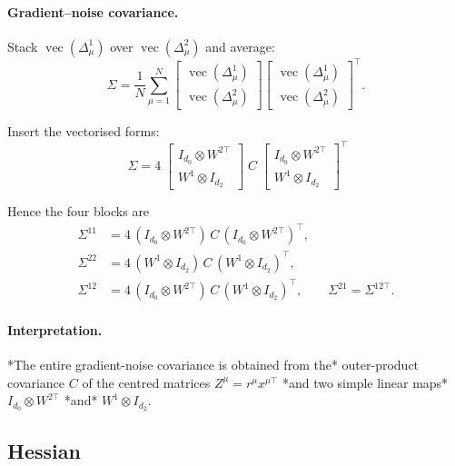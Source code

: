 \documentclass[11pt]{article}
\begin{document}
\paragraph{Gradient–noise covariance.}
Stack \(\operatorname{vec}(\Delta^{1}_{\mu})\) over \(\operatorname{vec}(\Delta^{2}_{\mu})\) and average:
\[
\Sigma
  =\frac1N\sum_{\mu=1}^{N}
  \begin{bmatrix}
      \operatorname{vec}(\Delta^{1}_{\mu})\\[2pt]
      \operatorname{vec}(\Delta^{2}_{\mu})
  \end{bmatrix}
  \begin{bmatrix}
      \operatorname{vec}(\Delta^{1}_{\mu})\\[2pt]
      \operatorname{vec}(\Delta^{2}_{\mu})
  \end{bmatrix}^{\!\top}.
\]

Insert the vectorised forms:
\[
\boxed{\;
\Sigma=
4\;
\begin{bmatrix}
I_{d_{0}}\!\otimes\!W^{2\!\top}\\[2pt]
W^{1}\!\otimes\!I_{d_{2}}
\end{bmatrix}
\;C\;
\begin{bmatrix}
I_{d_{0}}\!\otimes\!W^{2\!\top}\\[2pt]
W^{1}\!\otimes\!I_{d_{2}}
\end{bmatrix}^{\!\top}}
\]

\noindent
Hence the four blocks are
\[
\begin{aligned}
\Sigma^{11}&=4\,(I_{d_{0}}\!\otimes\!W^{2\!\top})\,C\,(I_{d_{0}}\!\otimes\!W^{2\!\top})^{\!\top},\\[4pt]
\Sigma^{22}&=4\,(W^{1}\!\otimes\!I_{d_{2}})\,C\,(W^{1}\!\otimes\!I_{d_{2}})^{\!\top},\\[4pt]
\Sigma^{12}&=4\,(I_{d_{0}}\!\otimes\!W^{2\!\top})\,C\,(W^{1}\!\otimes\!I_{d_{2}})^{\!\top},
\qquad
\Sigma^{21}=\Sigma^{12\!\top}.
\end{aligned}
\]

\paragraph{Interpretation.}
*The entire gradient-noise covariance is obtained from the*  
outer-product covariance \(C\) of the centred matrices
\(Z^{\mu}=r^{\mu}x^{\mu\!\top}\) *and two simple linear maps*
\(I_{d_{0}}\!\otimes\!W^{2\!\top}\) *and* \(W^{1}\!\otimes\!I_{d_{2}}\).
\subsection{Hessian}
\end{document}
